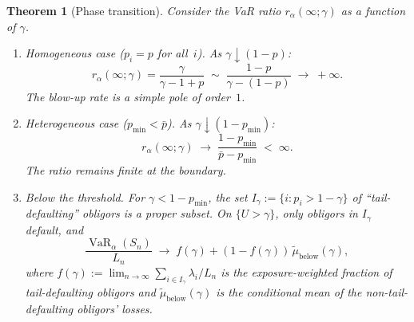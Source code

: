 \documentclass[11pt]{article}
\newtheorem{theorem}{Theorem}[section]
\theoremstyle{definition}
\newcommand{\VaR}{\operatorname{VaR}}
\newcommand{\1}{\mathbf{1}}
\begin{document}
\begin{theorem}[Phase transition]\label{thm:phase_transition}
Consider the VaR ratio $r_\alpha(\infty; \gamma)$ as a function of $\gamma$.

\begin{enumerate}[label=(\alph*)]
  \item \emph{Homogeneous case} ($p_i = p$ for all~$i$). As $\gamma \downarrow (1-p)$:
  \begin{equation}\label{eq:blowup_homo}
    r_\alpha(\infty; \gamma) = \frac{\gamma}{\gamma - 1 + p} \;\sim\; \frac{1-p}{\gamma - (1-p)} \;\to\; +\infty.
  \end{equation}
  The blow-up rate is a simple pole of order~$1$.

  \item \emph{Heterogeneous case} ($p_{\min} < \bar{p}$). As $\gamma \downarrow (1-p_{\min})$:
  \begin{equation}\label{eq:finite_hetero}
    r_\alpha(\infty; \gamma) \;\to\; \frac{1 - p_{\min}}{\bar{p} - p_{\min}} \;<\; \infty.
  \end{equation}
  The ratio remains finite at the boundary.

  \item \emph{Below the threshold}. For $\gamma < 1 - p_{\min}$, the set $I_\gamma := \{i : p_i > 1 - \gamma\}$ of ``tail-defaulting'' obligors is a proper subset. On $\{U > \gamma\}$, only obligors in $I_\gamma$ default, and
  \begin{equation}\label{eq:below_threshold}
    \frac{\VaR_\alpha(S_n)}{L_n} \;\to\; f(\gamma) + (1-f(\gamma))\,\tilde{\mu}_{\mathrm{below}}(\gamma),
  \end{equation}
  where $f(\gamma) := \lim_{n \to \infty} \sum_{i \in I_\gamma} \lambda_i / L_n$ is the exposure-weighted fraction of tail-defaulting obligors and $\tilde{\mu}_{\mathrm{below}}(\gamma)$ is the conditional mean of the non-tail-defaulting obligors' losses.
\end{enumerate}
\end{theorem}
\end{document}
